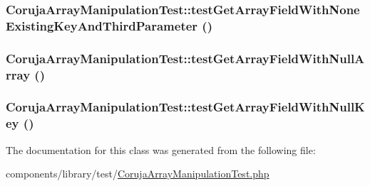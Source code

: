 \hypertarget{class_coruja_array_manipulation_test_1b71ccbdf79e11fbaed4fd93b3d97ee6}{
\subsubsection[{testGetArrayFieldWithNoneExistingKeyAndThirdParameter}]{\setlength{\rightskip}{0pt plus 5cm}CorujaArrayManipulationTest::testGetArrayFieldWithNoneExistingKeyAndThirdParameter ()}}
\label{class_coruja_array_manipulation_test_1b71ccbdf79e11fbaed4fd93b3d97ee6}


\hypertarget{class_coruja_array_manipulation_test_dabd8c0d53cf5be851dc7bc2d9e32b24}{
\subsubsection[{testGetArrayFieldWithNullArray}]{\setlength{\rightskip}{0pt plus 5cm}CorujaArrayManipulationTest::testGetArrayFieldWithNullArray ()}}
\label{class_coruja_array_manipulation_test_dabd8c0d53cf5be851dc7bc2d9e32b24}


\hypertarget{class_coruja_array_manipulation_test_8816ce6795b708ba877c5fe5e141ace5}{
\subsubsection[{testGetArrayFieldWithNullKey}]{\setlength{\rightskip}{0pt plus 5cm}CorujaArrayManipulationTest::testGetArrayFieldWithNullKey ()}}
\label{class_coruja_array_manipulation_test_8816ce6795b708ba877c5fe5e141ace5}




The documentation for this class was generated from the following file:\begin{CompactItemize}
\item 
components/library/test/\hyperlink{_coruja_array_manipulation_test_8php}{CorujaArrayManipulationTest.php}\end{CompactItemize}

